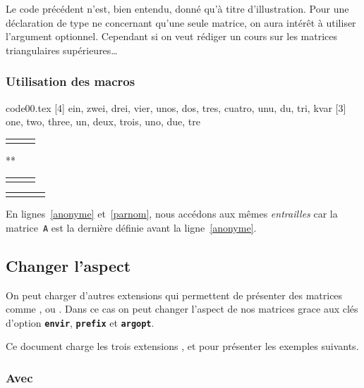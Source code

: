 \documentclass[full]{l3doc}
\newcommand{\MacroPres}[2]{\textcolor{#1}{\textbf{\cs{#2}}}}
\newcommand{\csprint}{\MacroPres{cmdcausante}}
\newcommand{\ObjetPres}[2]{\textcolor{#1}{\textbf{\texttt{#2}}}}
\newcommand{\keyname}{\ObjetPres{keycolor}}
\newcommand{\UnExemple}{%
  \par \medskip \par \noindent
  \begin{minipage}[c]{0.66\linewidth}
    
  \end{minipage}
  \hspace{\stretch{1}}
  \begin{minipage}[c]{0.32\linewidth}
    \small
    
  \end{minipage}
  \par \medbreak}
\begin{document}
Le code précédent n'est, bien entendu, donné qu'à titre d'illustration. Pour une
déclaration de type ne concernant qu'une seule matrice, on aura intérêt à
utiliser l'argument optionnel. Cependant si on veut rédiger un cours sur les
matrices triangulaires supérieures\dots{}

\subsubsection{Utilisation des macros \csprint{(La)MatriceInterieur}}
\label{sec:matint}

\begin{VerbatimOut}[gobble=0]{code00.tex}
[4]{
 \hline ein, zwei, drei, vier,
 \hline unos, dos, tres, cuatro,
 \hline unu, du, tri, kvar}%
[3]{
 one, two, three,
 un, deux, trois,
 uno, due, tre}%
\begin{tabular}{*{3}{l}}
  \MatriceInterieur %
\end{tabular}
\par \bigskip *** \par \bigskip
\begin{tabular}{*{3}{l}}
  \LaMatriceInterieur{A} %
\end{tabular}
\par \bigskip
\begin{tabular}{|*{4}{l|}}
  \LaMatriceInterieur{B}\hline
\end{tabular}
\end{VerbatimOut}
\UnExemple{}

En lignes~\ref{anonyme} et~\ref{parnom}, nous accédons aux mêmes
\emph{entrailles} car la matrice~\texttt{A} est la dernière définie avant la
ligne~\ref{anonyme}.


\subsection{Changer l'aspect}
\label{sec:aspect}

On peut charger d'autres extensions qui permettent de présenter des matrices
comme ,  ou . Dans ce cas on peut
changer l'aspect de nos matrices grace aux clés d'option \keyname{envir},
\keyname{prefix} et \keyname{argopt}.

Ce document charge les trois extensions ,  et
 pour présenter les exemples suivants.


\subsubsection{Avec }
\label{sec:mathtools}
\end{document}
